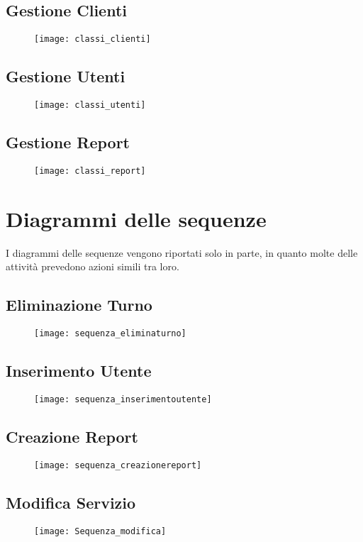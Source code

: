 \documentclass[green, fancy, 11pt]{elegantbook}
\begin{document}
\subsection{Gestione Clienti}
\begin{figure}[H]
	\texttt{[image: classi\_clienti]}
\end{figure}
\subsection{Gestione Utenti}
\begin{figure}[H]
	\texttt{[image: classi\_utenti]}
\end{figure}
\newpage

\subsection{Gestione Report}
\begin{figure}[H]
	\texttt{[image: classi\_report]}
\end{figure}
\newpage

\section{Diagrammi delle sequenze}
I diagrammi delle sequenze vengono riportati solo in parte, in quanto molte delle attività prevedono azioni simili tra loro.
\subsection{Eliminazione Turno}
\begin{figure}[H]
	\texttt{[image: sequenza\_eliminaturno]}
\end{figure}
\newpage
\subsection{Inserimento Utente}
\begin{figure}[H]
	\texttt{[image: sequenza\_inserimentoutente]}
\end{figure}
\subsection{Creazione Report}
\begin{figure}[H]
	\texttt{[image: sequenza\_creazionereport]}
\end{figure}
\newpage
\subsection{Modifica Servizio}
\begin{figure}[H]
	\texttt{[image: Sequenza\_modifica]}
\end{figure}
\newpage
\end{document}
